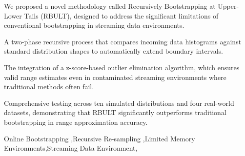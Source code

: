 \documentclass[a4paper,fleqn]{cas-dc}
\begin{document}
\begin{highlights}
\item We proposed a novel methodology called Recursively Bootstrapping at Upper-Lower Tails (RBULT), designed to address the significant limitations of conventional bootstrapping in streaming data environments.
\item A two-phase recursive process that compares incoming data histograms against standard distribution shapes to automatically extend boundary intervals.
\item The integration of a z-score-based outlier elimination algorithm, which ensures valid range estimates even in contaminated streaming environments where traditional methods often fail.
\item Comprehensive testing across ten simulated distributions and four real-world datasets, demonstrating that RBULT significantly outperforms traditional bootstrapping in range approximation accuracy.
\end{highlights}



\begin{keywords}
 Online Bootstrapping \sep Recursive Re-sampling \sep Limited Memory Environments\sep Streaming Data Environment\sep
\end{keywords}

\maketitle

\end{document}
